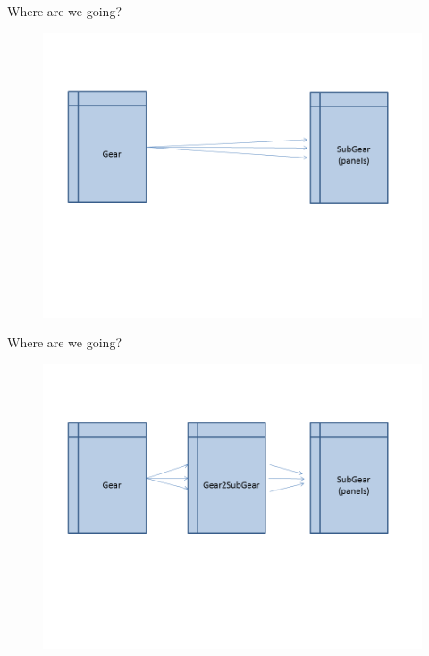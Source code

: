\documentclass[bigger]{beamer}
\begin{document}
\begin{frame}[label=sec-4]{Where are we going?}
\begin{figure}
\includegraphics[width=\textwidth]{GearTables1}
\end{figure}
\end{frame}

\begin{frame}[label=sec-5]{Where are we going?}
\begin{figure}
\includegraphics[width=\textwidth]{GearTables2}
\end{figure}
\end{frame}
\end{document}
